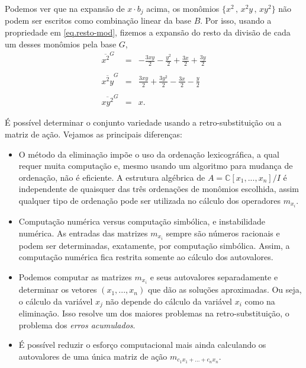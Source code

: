 \documentclass[a4paper,12pt,oneside,onecolumn,final,fleqn]{repUERJ}
\begin{document}
Podemos ver que na expansão de $x\cdot b_j$ acima, os monômios $\{x^2\,,\,x^2y\,,\,xy^2\}$ não podem ser escritos como combinação linear da base $B$. Por isso, usando a propriedade em \ref{eq.resto-mod}, fizemos a expansão do resto da divisão de cada um desses monômios pela base $G$,
\begin{equation*}
\begin{array}{rcl}
\overline{x^2}^{G}&=&-\frac{3xy}{2}-\frac{y^2}{2}+\frac{3x}{2}+\frac{3y}{2}\\\\
\overline{x^2y}^{G}&=&\frac{3xy}{2}+\frac{3y^2}{2}-\frac{3x}{2}-\frac{y}{2}\\\\
\overline{xy^2}^{G}&=&x.
\end{array}
\end{equation*}

É possível determinar o conjunto variedade usando a retro-substituição ou a matriz de ação. Vejamos as principais diferenças:
\begin{itemize}
\item O método da eliminação impõe o uso da ordenação
lexicográfica, a qual requer muita computação e, mesmo usando um algoritmo para mudança de ordenação, não é eficiente. A estrutura algébrica de $A={\mathbb{C}}[x_1,...,x_n]/I$
é independente de quaisquer das três ordenações de monômios escolhida, assim qualquer tipo de ordenação pode ser utilizada no cálculo dos operadores $m_{x_i}$.
\item Computação numérica versus computação simbólica, e instabilidade numérica. As entradas das matrizes $m_{x_i}$ sempre são números racionais e podem ser determinadas, exatamente, por
computação simbólica. Assim, a computação numérica fica restrita somente ao cálculo dos
autovalores.
\item  Podemos computar as matrizes $m_{x_i}$ 
 e seus autovalores separadamente e determinar os
vetores $(x_1,...,x_n)$
 que dão as soluções aproximadas. Ou seja, o cálculo da variável $x_j$
não depende do cálculo da variável $x_i$
 como na eliminação. Isso resolve um dos maiores problemas na retro-substituição, o problema dos {\it erros acumulados}.

\item É possível reduzir o esforço computacional mais ainda calculando os autovalores de uma única matriz de ação $m_{c_1x_1+...+c_nx_n}$.

\end{itemize}

\end{document}
